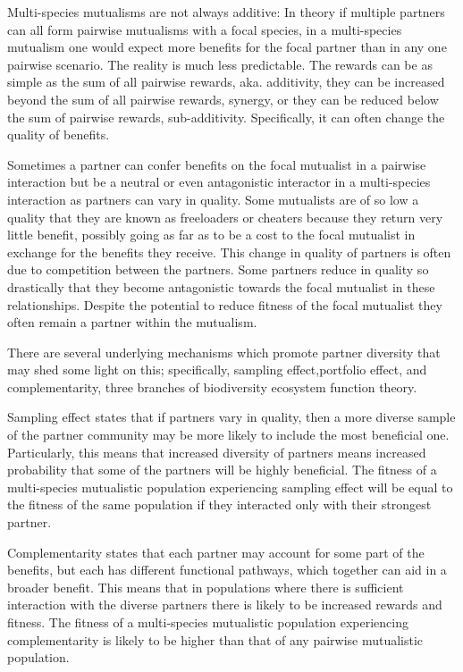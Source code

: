 \documentclass[12pt,a4paper]{article}
\begin{document}
	
	Multi-species mutualisms are not always additive: In theory if multiple partners can all form pairwise mutualisms with a focal species, in a multi-species mutualism one would expect more benefits for the focal partner than in any one pairwise scenario. The reality is much less predictable\cite{Stanton2013,Palmer2010,Song2020}. The rewards can be as simple as the sum of all pairwise rewards, aka. additivity, they can be increased beyond the sum of all pairwise rewards, synergy, or they can be reduced below the sum of pairwise rewards, sub-additivity. Specifically, it can often change the quality of benefits. 
	
	Sometimes a partner can confer benefits on the focal mutualist in a pairwise interaction but be a neutral or even antagonistic interactor in a multi-species interaction as partners can vary in quality\cite{Afkhami2014}. Some mutualists are of so low a quality that they are known as freeloaders or cheaters\cite{Song2020,West2007,Frederickson2013} because they return very little benefit, possibly going as far as to be a cost to the focal mutualist in exchange for the benefits they receive. This change in quality of partners is often due to competition between the partners\cite{Amarasekare2003}. Some partners reduce in quality so drastically that they become antagonistic towards the focal mutualist in these relationships\cite{Afkhami2014,Frederickson2013,Bronstein1994}. Despite the potential to reduce fitness of the focal mutualist they often remain a partner within the mutualism\cite{Jones2015}. 
	
    There are several underlying mechanisms which promote partner diversity that may shed some light on this; specifically, sampling effect,portfolio effect, and complementarity, three branches of biodiversity ecosystem function theory\cite{Batstone2018,Hooper2005}. 
    
    Sampling effect states that if partners vary in quality, then a more diverse sample of the partner community may be more likely to include the most beneficial one\cite{Afkhami2014}. Particularly, this means that increased diversity of partners means increased probability that some of the partners will be highly beneficial. The fitness of a multi-species mutualistic population experiencing sampling effect will be equal to the fitness of the same population if they interacted only with their strongest partner. 
    
    Complementarity states that each partner may account for some part of the benefits, but each has different functional pathways, which together can aid in a broader benefit\cite{Winfree2020}. This means that in populations where there is sufficient interaction with the diverse partners there is likely to be increased rewards and fitness. The fitness of a multi-species mutualistic population experiencing complementarity is likely to be higher than that of any pairwise mutualistic population. 
    
\end{document}

